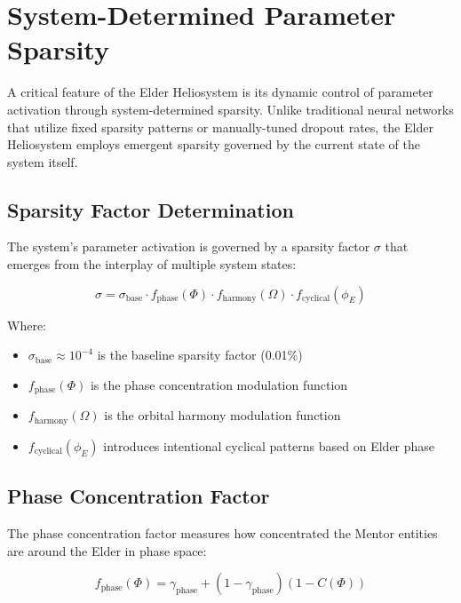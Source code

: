 \section{System-Determined Parameter Sparsity}

A critical feature of the Elder Heliosystem is its dynamic control of parameter activation through system-determined sparsity. Unlike traditional neural networks that utilize fixed sparsity patterns or manually-tuned dropout rates, the Elder Heliosystem employs emergent sparsity governed by the current state of the system itself.

\subsection{Sparsity Factor Determination}

The system's parameter activation is governed by a sparsity factor $\sigma$ that emerges from the interplay of multiple system states:

\begin{equation}
\sigma = \sigma_{\text{base}} \cdot f_{\text{phase}}(\Phi) \cdot f_{\text{harmony}}(\Omega) \cdot f_{\text{cyclical}}(\phi_E)
\end{equation}

Where:
\begin{itemize}
    \item $\sigma_{\text{base}} \approx 10^{-4}$ is the baseline sparsity factor (0.01\%)
    \item $f_{\text{phase}}(\Phi)$ is the phase concentration modulation function
    \item $f_{\text{harmony}}(\Omega)$ is the orbital harmony modulation function
    \item $f_{\text{cyclical}}(\phi_E)$ introduces intentional cyclical patterns based on Elder phase
\end{itemize}

\subsection{Phase Concentration Factor}

The phase concentration factor measures how concentrated the Mentor entities are around the Elder in phase space:

\begin{equation}
f_{\text{phase}}(\Phi) = \gamma_{\text{phase}} + (1 - \gamma_{\text{phase}})(1 - C(\Phi))
\end{equation}

